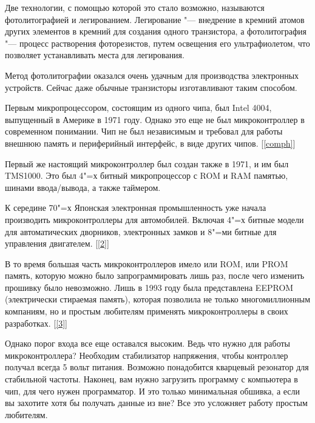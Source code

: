 \documentclass[14pt,a4paper]{extarticle}
\begin{document}
	Две технологии, с помощью которой это стало возможно, называются фотолитографией и легированием. Легирование "--- внедрение в кремний атомов других элементов в кремний для создания одного транзистора, а фотолитография "--- процесс растворения фоторезистов, путем освещения его ультрафиолетом, что позволяет устанавливать места для легирования.
	
	Метод фотолитографии оказался очень удачным для производства электронных устройств. Сейчас даже обычные транзисторы изготавливают таким способом.
	
	Первым микропроцессором, состоящим из одного чипа, был Intel 4004, выпущенный в Америке в 1971 году. Однако это еще не был микроконтроллер в современном понимании. Чип не был независимым и требовал для работы внешнюю память и периферийный интерфейс, в виде других чипов. [\ref{comph}] %
	
	Первый же настоящий микроконтроллер был создан также в 1971, и им был TMS1000. Это был 4"=х битный микропроцессор с ROM и RAM памятью, шинами ввода/вывода, а также таймером. 
	
	К середине 70"=х Японская электронная промышленность уже начала производить микроконтроллеры для автомобилей. Включая 4"=х битные модели для автоматических дворников, электронных замков и 8"=ми битные для управления двигателем.  [\ref{2}] %
	
	В то время большая часть микроконтроллеров имело или ROM, или PROM память, которую можно было запрограммировать лишь раз, после чего изменить прошивку было невозможно. Лишь в 1993 году была представлена EEPROM (электрически стираемая память), которая позволила не только многомиллионным компаниям, но и простым любителям применять микроконтроллеры в своих разработках.  [\ref{3}]  %
	
	Однако порог входа все еще оставался высоким. Ведь что нужно для работы микроконтроллера? Необходим стабилизатор напряжения, чтобы контроллер получал всегда 5 вольт питания. Возможно понадобится кварцевый резонатор для стабильной частоты. Наконец, вам нужно загрузить программу с компьютера в чип, для чего нужен программатор. И это только минимальная обшивка, а если вы захотите хотя бы получать данные из вне? Все это усложняет работу простым любителям.
	
\end{document}
